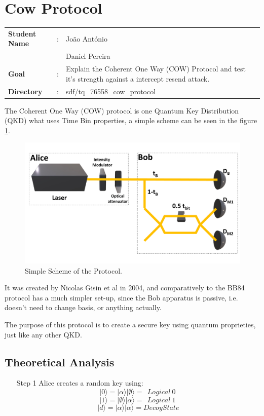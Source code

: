 \clearpage
\section{Cow Protocol}

\begin{refsection}

\begin{tcolorbox}	
\begin{tabular}{p{2.75cm} p{0.2cm} p{10.5cm}} 	
\textbf{Student Name}  &:&  Jo\~ao Ant\'onio\\
\textbf{}  & &  Daniel Pereira\\
\textbf{Goal}          &:& Explain the Coherent One Way (COW) Protocol and test it's strength against a intercept resend attack.\\
\textbf{Directory}     &:& sdf/tq\_76558\_cow\_protocol
\end{tabular}
\end{tcolorbox}

The Coherent One Way (COW) protocol is one Quantum Key Distribution (QKD) what uses Time Bin properties, a simple scheme can be seen in the figure \ref{fig:Scheme}.

\begin{figure}[h]
\centering
\includegraphics[width=.4\linewidth]{./sdf/tq_76558_cow_protocol/slides/figures/Full2.pdf}
\caption{Simple Scheme of the Protocol.}
\label{fig:Scheme}
\end{figure}

\par
It was created by Nicolas Gisin et al in 2004, and comparatively to the BB84 protocol has a much simpler set-up, since the Bob apparatus is passive, i.e. doesn't need to change basis, or anything actually.
\par
The purpose of this protocol is to create a secure key using quantum proprieties, just like any other QKD.

\subsection{Theoretical Analysis}

\begin{itemize}
\item [Step 1] Alice creates a random key using:
$$|0\rangle = |\alpha\rangle |\emptyset\rangle =\ \ Logical\ 0\ $$
  $$|1\rangle = |\emptyset\rangle |\alpha\rangle =\ \ Logical\ 1\ $$
$$|d\rangle = |\alpha\rangle |\alpha\rangle = Decoy State$$


\end{itemize}
\end{refsection}

